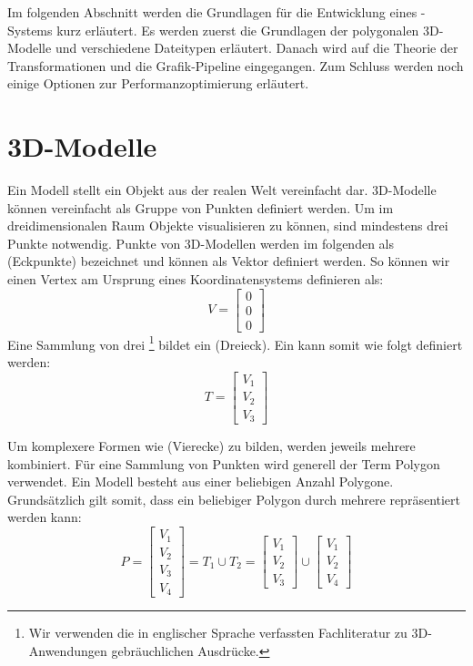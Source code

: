 
Im folgenden Abschnitt werden die Grundlagen für die Entwicklung eines -Systems kurz erläutert.
Es werden zuerst die Grundlagen der polygonalen 3D-Modelle und verschiedene Dateitypen erläutert. Danach wird auf die Theorie der Transformationen und die Grafik-Pipeline eingegangen. Zum Schluss werden noch einige Optionen zur Performanzoptimierung erläutert.

\section{3D-Modelle}
Ein Modell stellt ein Objekt aus der realen Welt vereinfacht dar.
3D-Modelle können vereinfacht als Gruppe von Punkten definiert werden.
Um im dreidimensionalen Raum Objekte visualisieren zu können, sind mindestens drei Punkte notwendig.
Punkte von 3D-Modellen werden im folgenden als  (Eckpunkte) bezeichnet und können als Vektor definiert werden.
So können wir einen Vertex am Ursprung eines Koordinatensystems definieren als:
$$ V =
\begin{bmatrix}
  0 \\
  0 \\
  0
\end{bmatrix}
$$
Eine Sammlung von drei \footnote{Wir verwenden die in englischer Sprache verfassten Fachliteratur zu 3D-Anwendungen gebräuchlichen Ausdrücke.} bildet ein  (Dreieck). Ein  kann somit wie folgt definiert werden:
$$ T =
\begin{bmatrix}
  V_1 \\
  V_2 \\
  V_3
\end{bmatrix}
$$

Um komplexere Formen wie  (Vierecke) zu bilden, werden jeweils mehrere  kombiniert. Für eine Sammlung von Punkten wird generell der Term Polygon verwendet.
Ein Modell besteht aus einer beliebigen Anzahl Polygone.
Grundsätzlich gilt somit, dass ein beliebiger Polygon durch mehrere  repräsentiert werden kann:
$$ P =
\begin{bmatrix}
  V_1 \\
  V_2 \\
  V_3 \\
  V_4
\end{bmatrix}
= T_1 \cup T_2
= \begin{bmatrix}
  V_1 \\
  V_2 \\
  V_3
\end{bmatrix}
\cup
\begin{bmatrix}
  V_1 \\
  V_2 \\
  V_4
\end{bmatrix}
$$

